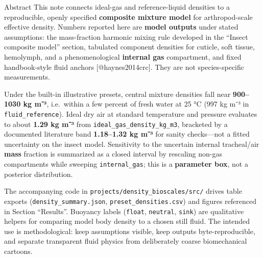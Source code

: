 \documentclass[
  ignorenonframetext,
]{beamer}
\author{\texorpdfstring{}{}}
\date{}
\begin{document}
\begin{frame}[fragile]{Abstract}
\protect{}\label{abstract}
This note connects ideal-gas and reference-liquid densities to a
reproducible, openly specified \textbf{composite mixture model} for
arthropod-scale effective density. Numbers reported here are
\textbf{model outputs} under stated assumptions: the mass-fraction
harmonic mixing rule developed in the ``Insect composite model''
section, tabulated component densities for cuticle, soft tissue,
hemolymph, and a phenomenological \textbf{internal gas} compartment, and
fixed handbook-style fluid anchors {[}@haynes2014crc{]}. They are not
species-specific measurements.

Under the built-in illustrative presets, central mixture densities fall
near \textbf{900--1030 kg m⁻³}, i.e.~within a few percent of fresh water
at 25 °C (997 kg m⁻³ in \texttt{fluid\_reference}). Ideal dry air at
standard temperature and pressure evaluates to about \textbf{1.29 kg
m⁻³} from \texttt{ideal\_gas\_density\_kg\_m3}, bracketed by a
documented literature band \textbf{1.18--1.32 kg m⁻³} for sanity
checks---not a fitted uncertainty on the insect model. Sensitivity to
the uncertain internal tracheal/air \textbf{mass} fraction is summarized
as a closed interval by rescaling non-gas compartments while sweeping
\texttt{internal\_gas}; this is a \textbf{parameter box}, not a
posterior distribution.

The accompanying code in \texttt{projects/density\_bioscales/src/}
drives table exports (\texttt{density\_summary.json},
\texttt{preset\_densities.csv}) and figures referenced in Section
``Results''. Buoyancy labels (\texttt{float}, \texttt{neutral},
\texttt{sink}) are qualitative helpers for comparing model body density
to a chosen still fluid. The intended use is methodological: keep
assumptions visible, keep outputs byte-reproducible, and separate
transparent fluid physics from deliberately coarse biomechanical
cartoons.
\end{frame}
\end{document}
